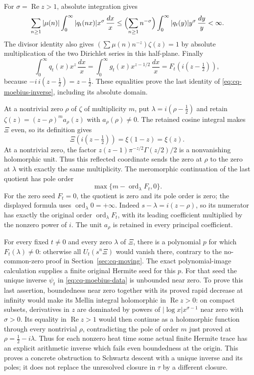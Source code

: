 For $\sigma=\operatorname{Re}z>1$, absolute integration gives
\[
 \sum_{n\geq1}|\mu(n)|\int_0^\infty
       |q_t(nx)|x^\sigma\,\frac{dx}{x}
 \leq\Bigl(\sum_{n\geq1}n^{-\sigma}\Bigr)
       \int_0^\infty|q_t(y)|y^\sigma\,\frac{dy}{y}<\infty.
\]
The divisor identity also gives
$(\sum\mu(n)n^{-z})\zeta(z)=1$ by absolute multiplication of
the two Dirichlet series in this half-plane. Finally
\[
 \int_0^\infty q_t(x)x^z\,\frac{dx}{x}
 =\int_0^\infty g_t(x)x^{z-1/2}\,\frac{dx}{x}
 =F_t(i(z-\tfrac12)),
\]
because $-i\,i(z-\tfrac12)=z-\tfrac12$.
These equalities prove the last identity of
\eqref{eq:cq-moebius-inverse}, including its absolute domain.

At a nontrivial zero $\rho$ of $\zeta$ of multiplicity $m$, put
$\lambda=i(\rho-\tfrac12)$ and retain
$\zeta(z)=(z-\rho)^m a_\rho(z)$ with $a_\rho(\rho)\ne0$.
The retained cosine integral makes $\Xi$ even, so its definition gives
\[
 \Xi(i(z-\tfrac12))=\xi(1-z)=\xi(z).
\]
At a nontrivial zero, the factor
$z(z-1)\pi^{-z/2}\Gamma(z/2)/2$ is a nonvanishing holomorphic
unit. Thus this reflected coordinate sends the zero at $\rho$
to the zero at $\lambda$ with exactly the same multiplicity.
The meromorphic continuation of the last quotient has pole order
\begin{equation}\label{eq:cq-moebius-pole}
 \max\{m-\operatorname{ord}_\lambda F_t,0\}.
\end{equation}
For the zero seed $F_t=0$, the quotient is zero and its pole order
is zero; the displayed formula uses $\operatorname{ord}_\lambda0=+\infty$.
Indeed $s-\lambda=i(z-\rho)$, so its numerator has exactly
the original order $\operatorname{ord}_\lambda F_t$, with its
leading coefficient multiplied by the nonzero power of $i$.
The unit $a_\rho$ is retained in every principal coefficient.

For every fixed $t\ne0$ and every zero $\lambda$ of $\Xi$, there
is a polynomial $p$ for which $F_t(\lambda)\ne0$: otherwise all
$U_t(s^n\Xi)$ would vanish there, contrary to the no-common-zero
proof in Section~\ref{sec:cq-moving}. The exact polynomial-image
calculation supplies a finite original Hermite seed for this $p$.
For that seed the unique inverse $\psi_t$ in
\eqref{eq:cq-moebius-data} is unbounded near zero. To prove this
last assertion, boundedness near zero together with its proved rapid
decrease at infinity would make its Mellin integral holomorphic in
$\operatorname{Re}z>0$: on compact subsets, derivatives in $z$
are dominated by powers of $|\log x|x^{\sigma-1}$ near zero
with $\sigma>0$. Its equality in $\operatorname{Re}z>1$ would
then continue as a holomorphic function through every nontrivial
$\rho$, contradicting the pole of order $m$ just proved at
$\rho=\tfrac12-i\lambda$. Thus for each nonzero heat time
some actual finite Hermite trace has an explicit arithmetic inverse
which fails even boundedness at the origin. This proves a concrete
obstruction to Schwartz descent with a unique inverse and its poles;
it does not replace the unresolved closure in $\tau$ by a different
closure.


